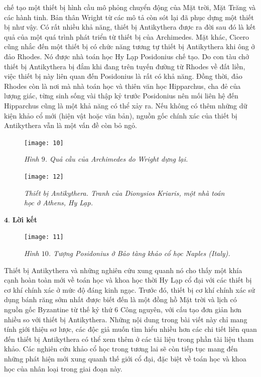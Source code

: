 \begin{multicols}{2}
	chế tạo một thiết bị hình cầu mô phỏng chuyển động của Mặt trời, Mặt Trăng và các hành tinh. Bản thân Wright từ các mô tả còn sót lại đã phục dựng một thiết bị như vậy. Có rất nhiều khả năng, thiết bị Antikythera được ra đời sau đó là kết quả của một quá trình phát triển từ thiết bị của Archimedes.
	\vskip 0.1cm
	Mặt khác, Cicero cũng nhắc đến một thiết bị có chức năng tương tự thiết bị Antikythera khi ông ở đảo Rhodes. Nó được nhà toán học Hy Lạp Posidonius chế tạo. Do con tàu chở thiết bị Antikythera bị đắm khi đang trên tuyến đường từ Rhodes về đất liền, việc thiết bị này liên quan đến Posidonius là rất có khả năng. Đồng thời, đảo Rhodes còn là nơi mà nhà toán học và thiên văn học Hipparchus, cha đẻ của lượng giác, từng sinh sống vài thập kỷ trước Posidonius nên mối liên hệ đến Hipparchus cũng là một khả năng có thể xảy ra. Nếu không có thêm những dữ kiện khảo cổ mới (hiện vật hoặc văn bản), nguồn gốc chính xác của thiết bị Antikythera vẫn là một vấn đề còn bỏ ngỏ.
	\begin{figure}[H]
		\vspace*{-5pt}
		\centering
		\captionsetup{labelformat= empty, justification=centering}
		\texttt{[image: 10]}
		\caption{\small\textit{\color{lichsutoanhoc}Hình $9$. Quả cầu của Archimedes do Wright dựng lại.}}
		\vspace*{-5pt}
	\end{figure}
	\begin{figure}[H]
		\centering
		\captionsetup{labelformat= empty, justification=centering}
		\texttt{[image: 12]}
		\caption{\small\textit{\color{lichsutoanhoc}Thiết bị Antikythera. Tranh của Dionysios Kriaris, một nhà toán học ở Athens, Hy Lạp.}}
		\vspace*{-10pt}
	\end{figure}
	$\pmb{4.}$ \textbf{\color{lichsutoanhoc}Lời kết}
	\vskip 0.2cm
	\begin{figure}
		\centering
		\captionsetup{labelformat= empty, justification=centering}
		\texttt{[image: 11]}
		\caption{\small\textit{\color{lichsutoanhoc}Hình $10$. Tượng Posidonius ở Bảo tàng khảo cổ học Naples (Italy).}}
		\vspace*{-10pt}
	\end{figure}
	Thiết bị Antikythera và những nghiên cứu xung quanh nó cho thấy một khía cạnh hoàn toàn mới về toán học và khoa học thời Hy Lạp cổ đại với các thiết bị cơ khí chính xác ở mức độ đáng kinh ngạc. Trước đó, thiết bị cơ khí chính xác sử dụng bánh răng sớm nhất được biết đến là một đồng hồ Mặt trời và lịch có nguồn gốc Byzantine từ thế kỷ thứ $6$ Công nguyên, với cấu tạo đơn giản hơn nhiều so với thiết bị Antikythera. Những nội dung trong bài viết này chỉ mang tính giới thiệu sơ lược, các độc giả muốn tìm hiểu nhiều hơn các chi tiết liên quan đến thiết bị Antikythera có thể xem thêm ở các tài liệu trong phần tài liệu tham khảo. Các nghiên cứu khảo cổ học trong tương lai sẽ còn tiếp tục mang đến những phát hiện mới xung quanh thế giới cổ đại, đặc biệt về toán học và khoa học của nhân loại trong giai đoạn này.

\end{multicols}
